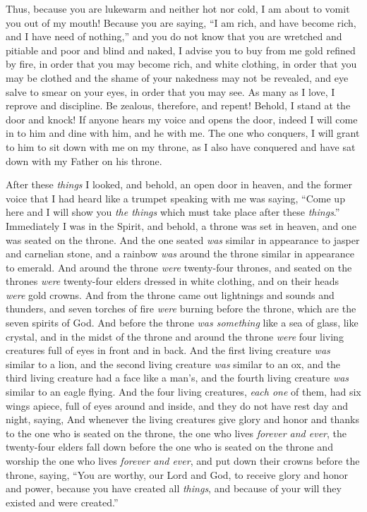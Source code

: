\begin{biblechapter}
\verse Thus, because you are lukewarm and neither hot nor cold, I am about to vomit you out of my mouth!
\verse Because you are saying, “I am rich, and have become rich, and I have need of nothing,” and you do not know that you are wretched and pitiable and poor and blind and naked,
\verse I advise you to buy from me gold refined by fire, in order that you may become rich, and white clothing, in order that you may be clothed and the shame of your nakedness may not be revealed, and eye salve to smear on your eyes, in order that you may see.
\verse As many as I love, I reprove and discipline. Be zealous, therefore, and repent!
\verse Behold, I stand at the door and knock! If anyone hears my voice and opens the door, indeed I will come in to him and dine with him, and he with me.
\verse The one who conquers, I will grant to him to sit down with me on my throne, as I also have conquered and have sat down with my Father on his throne.
\end{biblechapter}

\begin{biblechapter} %
 After these \textit{things} I looked, and behold, an open door in heaven, and the former voice that I had heard like a trumpet speaking with me was saying, “Come up here and I will show you \textit{the things} which must take place after these \textit{things}.”
\verse Immediately I was in the Spirit, and behold, a throne was set in heaven, and one was seated on the throne.
\verse And the one seated \textit{was} similar in appearance to jasper and carnelian stone, and a rainbow \textit{was} around the throne similar in appearance to emerald.
\verse And around the throne \textit{were} twenty-four thrones, and seated on the thrones \textit{were} twenty-four elders dressed in white clothing, and on their heads \textit{were} gold crowns.
\verse And from the throne came out lightnings and sounds and thunders, and seven torches of fire \textit{were} burning before the throne, which are the seven spirits of God.
\verse And before the throne \textit{was something} like a sea of glass, like crystal, and in the midst of the throne and around the throne \textit{were} four living creatures full of eyes in front and in back.
\verse And the first living creature \textit{was} similar to a lion, and the second living creature \textit{was} similar to an ox, and the third living creature had a face like a man’s, and the fourth living creature \textit{was} similar to an eagle flying.
\verse And the four living creatures, \textit{each one} of them, had six wings apiece, full of eyes around and inside, and they do not have rest day and night, saying,
\verse And whenever the living creatures give glory and honor and thanks to the one who is seated on the throne, the one who lives \textit{forever and ever},
\verse the twenty-four elders fall down before the one who is seated on the throne and worship the one who lives \textit{forever and ever}, and put down their crowns before the throne, saying,
\verse “You are worthy, our Lord and God, 
to receive glory and honor and power, 
because you have created all \textit{things}, 
and because of your will they existed and were created.”
\end{biblechapter}

